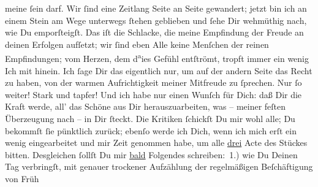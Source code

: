                    meine{ }ſein darf. Wir{ }ſind eine Zeitlang Seite an Seite gewandert; jetzt bin
               ich an einem Stein am Wege unterwegs{ }ſtehen geblieben und{ }ſehe Dir wehmüthig nach,
               wie Du emporſteigſt. Das iſt die Schlacke, die meine Empfindung der Freude an deinen
               Erfolgen aufſetzt; wir{ }ſind eben Alle keine Menſchen der reinen Empfindungen; vom
               Herzen, dem d\substVorne{}\textsuperscript{a}\substDazwischen{}ie\substHinten{}s Gefühl entſtrömt, tropft immer ein wenig Ich mit hinein. Ich{ }ſage Dir das
               eigentlich nur, um auf der andern Seite das Recht zu haben, von der warmen
               Aufrichtigkeit meiner Mitfreude zu{ }ſprechen. Nur{ }ſo weiter! Stark und tapfer! Und ich
               habe nur einen Wunſch für Dich: daß \strikeout{\textcolor{gray}{al}} Dir  die Kraft werde, all’ das Schöne
               aus Dir herauszuarbeiten, was – meiner feſten Überzeugung nach – in Dir{ }ſteckt. Die
               Kritiken{ }ſchickſt Du mir wohl alle; Du bekommſt{ }ſie pünktlich zurück; ebenſo werde
               ich Dich, wenn ich mich erſt ein wenig eingearbeitet und mir Zeit genommen habe, um
               alle \uline{drei} Acte des Stückes
                {\pb}bitten. Desgleichen{ }ſollſt Du mir \uline{bald}{ }Folgendes schreiben: 1.) wie Du Deinen Tag
               verbringſt, mit genauer trockener Aufzählung der regelmäßigen Beſchäftigung von Früh
